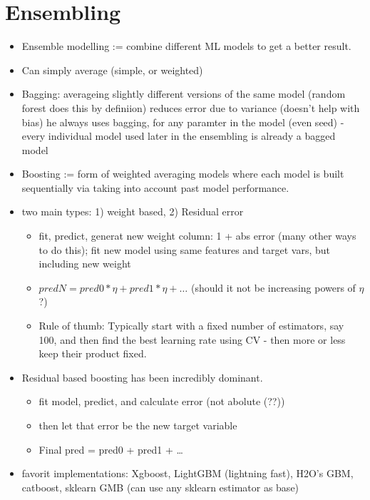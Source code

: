 \documentclass[a4paper]{report}
\begin{document}
\section{Ensembling}
\begin{itemize}
  \item  Ensemble modelling := combine different ML models to get a better result.
  \item Can simply average (simple, or weighted)
  \item Bagging: averageing slightly different versions of the same model (random forest does this by definiion)
    \subitem reduces error due to variance (doesn't help with bias)
    \subitem he always uses bagging, for any paramter in the model (even seed) - every individual model used later in the ensembling is already a bagged model
  \item Boosting := form of weighted averaging models where each model is built sequentially via taking into account past model performance.
  \item two main types: 1) weight based, 2) Residual error
  \begin{itemize}
    \item fit, predict, generat new weight column: 1 + abs error (many other ways to do this); fit new model using same features and target vars, but including new weight
    \item $pred N = pred0 * \eta + pred1 * \eta + \dots$  {\color{red}(should it not be increasing powers of $\eta$?)}
      \item Rule of thumb: Typically start with a fixed number of estimators, say 100, and then find the best learning rate using CV - then more or less keep their product fixed.
    \end{itemize}
  \item Residual based boosting has been incredibly dominant.
    \begin{itemize}
      \item fit model, predict, and calculate error (not abolute {\color{red}(??)})
      \item then let that error be the new target variable
      \item Final pred = pred0 + pred1 + \dots
    \end{itemize}
  \item favorit implementations: Xgboost, LightGBM (lightning fast), H2O's GBM, catboost, sklearn GMB (can use any sklearn estimator as base)
\end{itemize}
\end{document}
